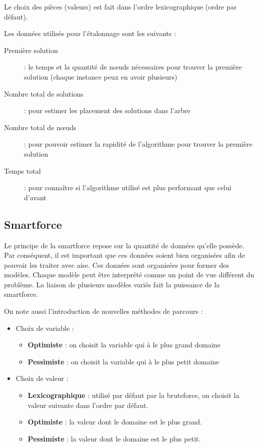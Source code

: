	Le choix des pièces (valeurs) est fait dans l'ordre lexicographique (ordre par défaut).
	
	Les données utilisés pour l'étalonnage sont les suivants :
	
	\begin{description}
		\item[Première solution] : le temps et la quantité de n\oe uds nécessaires pour trouver la première solution (chaque instance peux en avoir plusieurs)
		\item[Nombre total de solutions] : pour estimer les placement des solutions dans l'arbre
		\item[Nombre total de n\oe uds] : pour pouvoir estimer la rapidité de l'algorithme pour trouver la première solution
		\item[Temps total] : pour connaître si l'algorithme utilisé est plus performant que celui d'avant
	\end{description}
\newpage

	\subsection{Smartforce}

	Le principe de la smartforce repose sur la quantité de données qu'elle possède. Par conséquent, il est important que ces données soient bien organisées afin de pouvoir les traiter avec aise. Ces données sont organisées pour former des modèles. Chaque modèle peut être interprété comme un point de vue différent du problème. La liaison de plusieurs modèles variés fait la puissance de la smartforce.
	
	On note aussi l'introduction de nouvelles méthodes de parcours :
	
	\begin{itemize}
		\item Choix de variable :
		\begin{itemize}
			\item\textbf{Optimiste} : on choisit la variable qui à le plus grand domaine
			\item\textbf{Pessimiste} : on choisit la variable qui à le plus petit domaine
		\end{itemize}
		\item Choix de valeur :
		\begin{itemize}
			\item \textbf{Lexicographique} : utilisé par défaut par la bruteforce, on choisit la valeur suivante dans l'ordre par défaut.
			\item \textbf{Optimiste} : la valeur dont le domaine est le plus grand.
			\item \textbf{Pessimiste} : la valeur dont le domaine est le plus petit.
		\end{itemize}
	\end{itemize}
	
